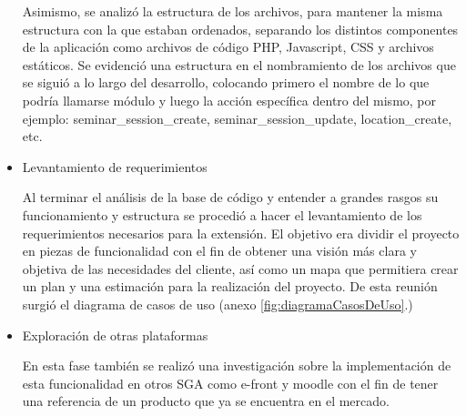 \begin{itemize}
Asimismo, se analizó la estructura de los archivos, para mantener la misma estructura con la que estaban ordenados, separando los distintos componentes de la aplicación como archivos de código PHP, Javascript, \gls{CSS} y archivos estáticos. Se evidenció una estructura en el nombramiento de los archivos que se siguió a lo largo del desarrollo, colocando primero el nombre de lo que podría llamarse módulo y luego la acción específica dentro del mismo, por ejemplo: seminar\_session\_create, seminar\_session\_update, location\_create, etc.

\item Levantamiento de requerimientos

Al terminar el análisis de la base de código y entender a grandes rasgos su funcionamiento y estructura se procedió a hacer el levantamiento de los requerimientos necesarios para la extensión. El objetivo era dividir el proyecto en piezas de funcionalidad con el fin de obtener una visión más clara y objetiva de las necesidades del cliente, así como un mapa que permitiera crear un plan y una estimación para la realización del proyecto. De esta reunión surgió el diagrama de casos de uso (anexo \ref{fig:diagramaCasosDeUso}.)

\item Exploración de otras plataformas

En esta fase también se realizó una investigación sobre la implementación de esta funcionalidad en otros SGA como e-front y moodle con el fin de tener una referencia de un producto que ya se encuentra en el mercado.

\end{itemize}






